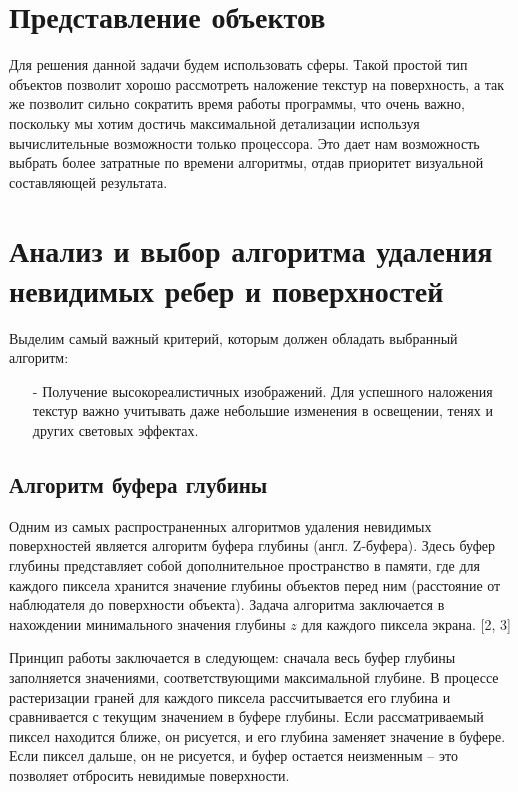 \section{Представление объектов}

Для решения данной задачи будем использовать сферы. Такой простой тип объектов позволит хорошо рассмотреть наложение текстур на поверхность, а так же позволит сильно сократить время работы программы, что очень важно, поскольку мы хотим достичь максимальной детализации используя вычислительные возможности только процессора. Это дает нам возможность выбрать более затратные по времени алгоритмы, отдав приоритет визуальной составляющей результата.

\section{Анализ и выбор алгоритма удаления невидимых ребер и поверхностей}

Выделим самый важный критерий, которым должен обладать выбранный алгоритм:
\begin{itemize}[label=\arabic*)]
	\item[-] Получение высокореалистичных изображений. Для успешного наложения текстур важно учитывать даже небольшие изменения в освещении, тенях и других световых эффектах.
\end{itemize}

\subsection{Алгоритм буфера глубины}

Одним из самых распространенных алгоритмов удаления невидимых поверхностей является алгоритм буфера глубины (англ. Z-буфера). Здесь буфер глубины представляет собой дополнительное пространство в памяти, где для каждого пиксела хранится значение глубины объектов перед ним (расстояние от наблюдателя до поверхности объекта). Задача алгоритма заключается в нахождении минимального значения глубины $z$ для каждого пиксела экрана. [2, 3]

Принцип работы заключается в следующем: сначала весь буфер глубины
заполняется значениями, соответствующими максимальной глубине. В процессе растеризации граней для каждого пиксела рассчитывается его глубина и сравнивается с текущим значением в буфере глубины. Если рассматриваемый пиксел находится ближе, он рисуется, и его глубина заменяет значение в буфере. Если пиксел дальше, он не рисуется, и буфер остается неизменным – это позволяет отбросить невидимые поверхности.

